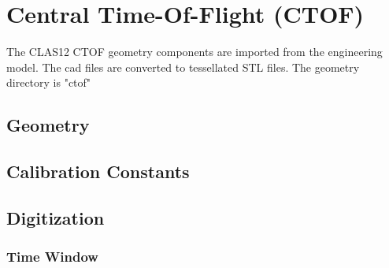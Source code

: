 \section{Central Time-Of-Flight (CTOF)}

The CLAS12 CTOF geometry components are imported from the engineering model. The cad files are converted to tessellated STL files.
The geometry directory is "ctof"

\subsection{Geometry}

\subsection{Calibration Constants}

\subsection{Digitization}

\subsubsection{Time Window}

